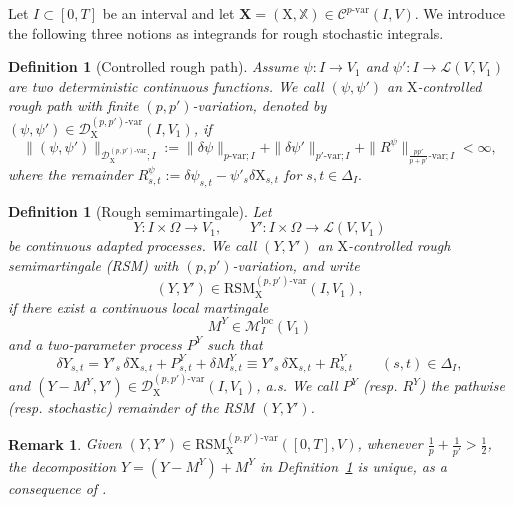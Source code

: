 \documentclass[11pt,reqno]{amsart}
\newtheorem{definition}[lemma]{Definition}
\newtheorem{remark}[lemma]{Remark}
\numberwithin{equation}{section}
\begin{document}
Let $I\subset[0,T]$ be an interval and let $\mathbf X=(\mathrm X,\mathbb X)\in \mathscr{C}^{p\text{-}\mathrm{var}}(I,V)$. We introduce the following three notions as integrands for rough stochastic integrals.


\begin{definition}[Controlled rough path]\label{def:control rough path} 
Assume $\psi:I \to V_1$ and $\psi':I \to \mathscr L(V,V_1)$ are two deterministic continuous functions. We call $(\psi,\psi')$ an $\mathrm X$-controlled rough path with finite $(p,p')$-variation, denoted by $(\psi,\psi')\in \mathscr{D}^{(p,p')\text{-}\mathrm{var}}_{\mathrm X}(I,V_1)$, if 
\begin{equation*}
\|(\psi,\psi')\|_{\mathscr{D}^{(p,p')\text{-}\mathrm{var}}_{\mathrm X};I} := \|\delta \psi\|_{p\text{-}\mathrm{var};I} + \|\delta \psi'\|_{p'\text{-}\mathrm{var};I} + \|R^{\psi}\|_{\frac{pp'}{p+p'}\text{-}\mathrm{var};I} <\infty ,
\end{equation*}
where the remainder $R^{\psi}_{s,t} := \delta \psi_{s,t} - \psi'_{s}\delta\mathrm X_{s,t}$ for $s,t\in \Delta_I.$
\end{definition}


\begin{definition}[Rough semimartingale]\label{def:rough semimartingale}
Let
\[
Y : I \times \Omega \to V_1,
\qquad
Y' : I \times \Omega \to \mathscr{L}(V,V_1)
\]
be continuous adapted processes. We call $(Y,Y')$ an
$\mathrm{X}$-controlled rough semimartingale ({\em RSM}) with $(p,p')$-variation,
and write
\[
(Y,Y')
\in
\mathrm{RSM}^{(p,p')\text{-}\mathrm{var}}_{\mathrm{X}}(I,V_1),
\]
if there exist a continuous local martingale
\[
M^Y \in \mathcal{M}_I^{\mathrm{loc}}(V_1)
\]
and a two-parameter process $P^Y$ such that
\[
\delta Y_{s,t}
=
Y'_s\,\delta \mathrm{X}_{s,t} 
+
P^Y_{s,t}
+
\delta M^Y_{s,t} 
\equiv
Y'_s\,\delta \mathrm{X}_{s,t} 
+
R^Y_{s,t}
\qquad
(s,t)\in\Delta_I,
\]
and $(Y-M^Y,Y') 
\in \mathscr{D}^{(p,p')\text{-}\mathrm{var}}_{\mathrm X}(I,V_1)$, a.s.
We call $P^Y$ (resp. $R^Y$) the pathwise (resp. stochastic) remainder 
of the \emph{RSM} $(Y,Y')$. 
\end{definition}


\begin{remark}\label{rem:given (Y,Y') in RSm}
Given $(Y,Y')\in\mathrm{RSM}^{(p,p')\text{-}\mathrm{var}}_{\mathrm X}([0,T],V)$, whenever $\frac{1}{p} + \frac{1}{p'} > \frac{1}{2}$, the decomposition $Y = (Y - M^Y) + M^{Y}$ in Definition~\ref{def:rough semimartingale} is unique, as a consequence of \cite[Theorem~1.6]{friz2023rough}.
\end{remark} 
\end{document}
